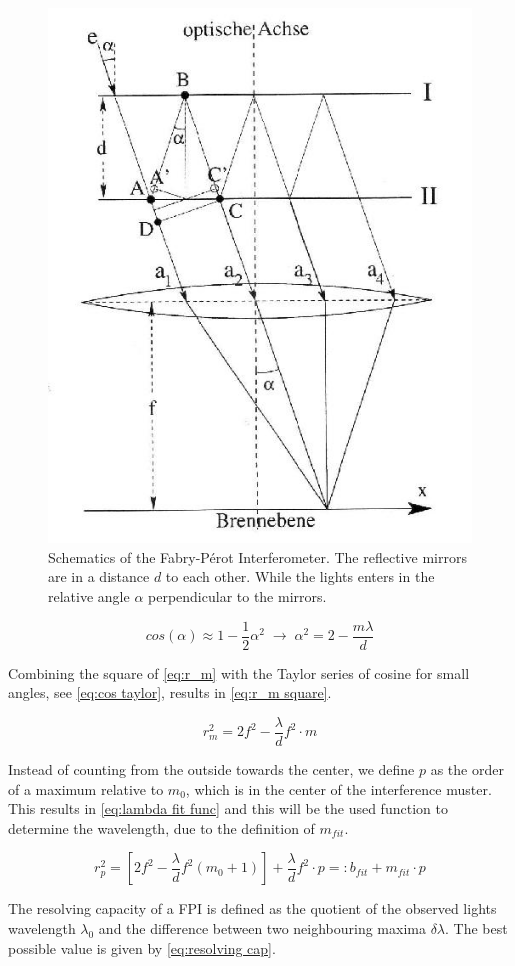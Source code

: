 \documentclass[]{article}
\begin{document}
\begin{figure}[H]
\centering
\includegraphics[width=.5\textwidth]{Plots/FPI.jpg}
\caption{Schematics of the Fabry-Pérot Interferometer. The reflective mirrors are in a distance $d$ to each other. While the lights enters in the relative angle $\alpha$ perpendicular to the mirrors. }
\label{fig:fpi}
\end{figure}

\begin{equation}
cos(\alpha) \approx 1 - \frac{1}{2}\alpha^2 \;\rightarrow\; \alpha^2 =2 - \frac{m\lambda}{d}
\label{eq:cos taylor}
\end{equation}

Combining the square of \autoref{eq:r_m} with the Taylor series of cosine for small angles, see \autoref{eq:cos taylor}, results in \autoref{eq:r_m square}.

\begin{equation}
r_m^2 = 2 f^2 - \frac{\lambda}{d}f^2\cdot m
\label{eq:r_m square}
\end{equation}

Instead of counting from the outside towards the center, we define $p$ as the order of a maximum relative to $m_0$, which is in the center of the interference muster. This results in \autoref{eq:lambda fit func} and this will be the used function to determine the wavelength, due to the definition of $m_{fit}$.

\begin{equation}
r_p^2= \left[ 2 f^2 - \frac{\lambda}{d} f^2 (m_0+1) \right] + \frac{\lambda}{d} f^2 \cdot p =: b_{fit} + m_{fit}\cdot p
\label{eq:lambda fit func}
\end{equation}

The resolving capacity of a FPI is defined as the quotient of the observed lights wavelength $\lambda_0$ and the difference between two neighbouring maxima $\delta \lambda$. The best possible value is given by \autoref{eq:resolving cap}.
\end{document}
